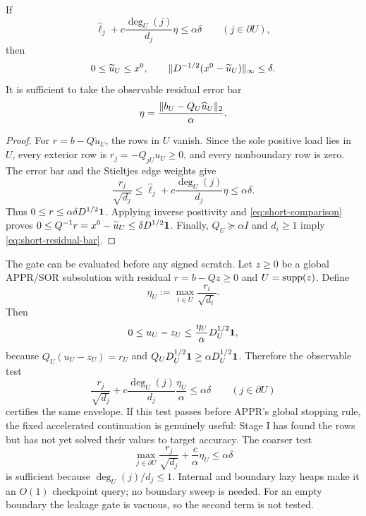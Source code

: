 \begin{theorem}
\label{thm:short-leakage}
If
\begin{equation}
 \widehat\ell_j+c\frac{\deg_U(j)}{d_j}\eta
 \leq\alpha\delta
 \qquad(j\in\partial U),
 \label{eq:short-leakage-gate}
\end{equation}
then
\begin{equation}
 0\leq\widetilde u_U\leq x^0,
 \qquad
 \lVert D^{-1/2}(x^0-\widetilde u_U)\rVert_\infty\leq\delta.
 \label{eq:short-leakage-result}
\end{equation}
It is sufficient to take the observable residual error bar
\begin{equation}
 \eta=\frac{\lVert b_U-Q_U\widehat u_U\rVert_2}{\alpha}.
 \label{eq:short-residual-bar}
\end{equation}
\end{theorem}

\begin{proof}
For $r=b-Q\widetilde u_U$, the rows in $U$ vanish.  Since the sole positive
load lies in $U$, every exterior row is
$r_j=-Q_{jU}u_U\geq0$, and every nonboundary row is zero.  The error bar and
the Stieltjes edge weights give
\begin{equation*}
 \frac{r_j}{\sqrt{d_j}}
 \leq \widehat\ell_j
      +c\frac{\deg_U(j)}{d_j}\eta
 \leq\alpha\delta.
\end{equation*}
Thus $0\leq r\leq\alpha\delta D^{1/2}\mathbf{1}$.  Applying inverse positivity
and \cref{eq:short-comparison} proves
$0\leq Q^{-1}r=x^0-\widetilde u_U\leq\delta D^{1/2}\mathbf{1}$.
Finally, $Q_U\succeq\alpha I$ and $d_i\geq1$ imply
\cref{eq:short-residual-bar}.
\end{proof}

The gate can be evaluated before any signed scratch.  Let $z\geq0$ be a
global APPR/SOR subsolution with residual $r=b-Qz\geq0$ and
$U=\operatorname{supp}(z)$.  Define
\begin{equation*}
 \eta_U:=\max_{i\in U}\frac{r_i}{\sqrt{d_i}}.
\end{equation*}
Then
\begin{equation}
 0\leq u_U-z_U\leq\frac{\eta_U}{\alpha}D_U^{1/2}\mathbf{1},
 \label{eq:short-monotone-box}
\end{equation}
because $Q_U(u_U-z_U)=r_U$ and
$Q_UD_U^{1/2}\mathbf{1}\geq\alpha D_U^{1/2}\mathbf{1}$.  Therefore the observable test
\begin{equation}
 \frac{r_j}{\sqrt{d_j}}
 +c\frac{\deg_U(j)}{d_j}\frac{\eta_U}{\alpha}
 \leq\alpha\delta
 \qquad(j\in\partial U)
 \label{eq:short-monotone-leakage}
\end{equation}
certifies the same envelope.  If this test passes before APPR's global
stopping rule, the fixed accelerated continuation is genuinely useful: Stage
I has found the rows but has not yet solved their values to target accuracy.
The coarser test
\begin{equation}
 \max_{j\in\partial U}\frac{r_j}{\sqrt{d_j}}
 +\frac{c}{\alpha}\eta_U\leq\alpha\delta
 \label{eq:short-two-heap-gate}
\end{equation}
is sufficient because $\deg_U(j)/d_j\leq1$.  Internal and boundary lazy heaps
make it an $O(1)$ checkpoint query; no boundary sweep is needed.
For an empty boundary the leakage gate is vacuous, so the second term is not
tested.

